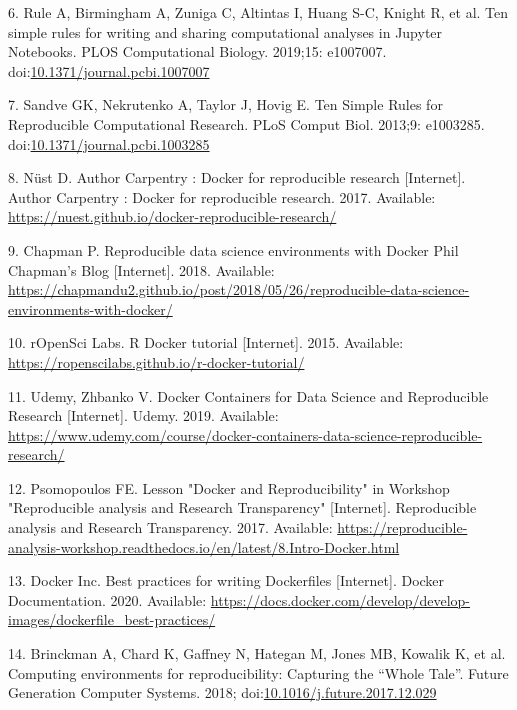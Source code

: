 \documentclass[10pt,letterpaper]{article}
\begin{document}
\leavevmode\hypertarget{ref-rule_ten_2019}{}%
6. Rule A, Birmingham A, Zuniga C, Altintas I, Huang S-C, Knight R, et
al. Ten simple rules for writing and sharing computational analyses in
Jupyter Notebooks. PLOS Computational Biology. 2019;15: e1007007.
doi:\href{https://doi.org/10.1371/journal.pcbi.1007007}{10.1371/journal.pcbi.1007007}

\leavevmode\hypertarget{ref-sandve_ten_2013}{}%
7. Sandve GK, Nekrutenko A, Taylor J, Hovig E. Ten Simple Rules for
Reproducible Computational Research. PLoS Comput Biol. 2013;9: e1003285.
doi:\href{https://doi.org/10.1371/journal.pcbi.1003285}{10.1371/journal.pcbi.1003285}

\leavevmode\hypertarget{ref-nust_author_2017}{}%
8. Nüst D. Author Carpentry : Docker for reproducible research
{[}Internet{]}. Author Carpentry : Docker for reproducible research.
2017. Available:
\url{https://nuest.github.io/docker-reproducible-research/}

\leavevmode\hypertarget{ref-chapman_reproducible_2018}{}%
9. Chapman P. Reproducible data science environments with Docker Phil
Chapman's Blog {[}Internet{]}. 2018. Available:
\url{https://chapmandu2.github.io/post/2018/05/26/reproducible-data-science-environments-with-docker/}

\leavevmode\hypertarget{ref-ropensci_labs_r_2015}{}%
10. rOpenSci Labs. R Docker tutorial {[}Internet{]}. 2015. Available:
\url{https://ropenscilabs.github.io/r-docker-tutorial/}

\leavevmode\hypertarget{ref-udemy_docker_2019}{}%
11. Udemy, Zhbanko V. Docker Containers for Data Science and
Reproducible Research {[}Internet{]}. Udemy. 2019. Available:
\url{https://www.udemy.com/course/docker-containers-data-science-reproducible-research/}

\leavevmode\hypertarget{ref-psomopoulos_lesson_2017}{}%
12. Psomopoulos FE. Lesson "Docker and Reproducibility" in Workshop
"Reproducible analysis and Research Transparency" {[}Internet{]}.
Reproducible analysis and Research Transparency. 2017. Available:
\url{https://reproducible-analysis-workshop.readthedocs.io/en/latest/8.Intro-Docker.html}

\leavevmode\hypertarget{ref-docker_inc_best_2020}{}%
13. Docker Inc. Best practices for writing Dockerfiles {[}Internet{]}.
Docker Documentation. 2020. Available:
\url{https://docs.docker.com/develop/develop-images/dockerfile_best-practices/}

\leavevmode\hypertarget{ref-brinckman_computing_2018}{}%
14. Brinckman A, Chard K, Gaffney N, Hategan M, Jones MB, Kowalik K, et
al. Computing environments for reproducibility: Capturing the ``Whole
Tale''. Future Generation Computer Systems. 2018;
doi:\href{https://doi.org/10.1016/j.future.2017.12.029}{10.1016/j.future.2017.12.029}
\end{document}
